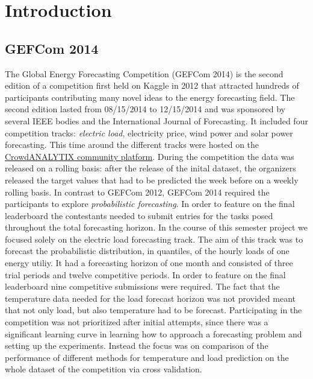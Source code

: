 \documentclass[conference]{IEEEtran}
\begin{document}
%
\IEEEpeerreviewmaketitle

\section{Introduction}
\subsection{GEFCom 2014}
\label{sec:gefcom2014}
The Global Energy Forecasting Competition (GEFCom 2014) is the second edition of a competition first held on Kaggle in 2012 that attracted hundreds of participants contributing many novel ideas to the energy forecasting field. The second edition lasted from 08/15/2014 to 12/15/2014 and was sponsored by several IEEE bodies and the International Journal of Forecasting. It included four competition tracks: \emph{electric load}, electricity price, wind power and solar power forecasting. This time around the different tracks were hosted on the \href{https://crowdanalytix.com/jq/solver.html}{CrowdANALYTIX community platform}. During the competition the data was released on a rolling basis: after the release of the inital dataset, the organizers released the target values that had to be predicted the week before on a weekly rolling basis. In contrast to GEFCom 2012, GEFCom 2014 required the participants to explore \emph{probabilistic forecasting}. In order to feature on the final leaderboard the contestants needed to submit entries for the tasks posed throughout the total forecasting horizon. In the course of this semester project we focused solely on the electric load forecasting track. The aim of this track was to forecast the probabilistic distribution, in quantiles, of the hourly loads of one energy utiliy. It had a forecasting horizon of one month and consisted of three trial periods and twelve competitive periods. In order to feature on the final leaderboard nine competitive submissions were required. The fact that the temperature data needed for the load forecast horizon was not provided meant that not only load, but also temperature had to be forecast. Participating in the competition was not prioritized after initial attempts, since there was a significant learning curve in learning how to approach a forecasting problem and setting up the experiments. Instead the focus was on comparison of the performance of different methods for temperature and load prediction on the whole dataset of the competition via cross validation.
\end{document}
